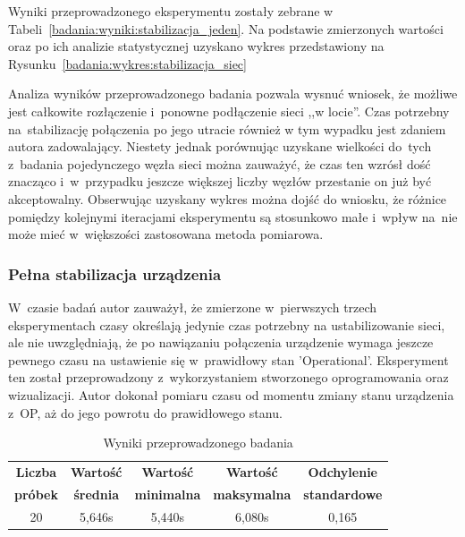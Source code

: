 \noindent Wyniki przeprowadzonego eksperymentu zostały zebrane w Tabeli~\ref{badania:wyniki:stabilizacja_jeden}. Na podstawie zmierzonych wartości oraz po ich analizie statystycznej uzyskano wykres przedstawiony na Rysunku~\ref{badania:wykres:stabilizacja_siec}


Analiza wyników przeprowadzonego badania pozwala wysnuć wniosek, że możliwe jest całkowite rozłączenie i~ponowne podłączenie sieci ,,w locie''. Czas potrzebny na~stabilizację połączenia po jego utracie również w tym wypadku jest zdaniem autora zadowalający. Niestety jednak porównując uzyskane wielkości do~tych z~badania pojedynczego węzła sieci można zauważyć, że czas ten wzrósł dość znacząco i~w~przypadku jeszcze większej liczby węzłów przestanie on już być akceptowalny. Obserwując uzyskany wykres można dojść do wniosku, że różnice pomiędzy kolejnymi iteracjami eksperymentu są stosunkowo małe i~wpływ na~nie może mieć w~większości zastosowana metoda pomiarowa.

\subsubsection{Pełna stabilizacja urządzenia}
W~czasie badań autor zauważył, że zmierzone w~pierwszych trzech eksperymentach czasy określają jedynie czas potrzebny na ustabilizowanie sieci, ale nie uwzględniają, że po nawiązaniu połączenia urządzenie wymaga jeszcze pewnego czasu na ustawienie się w~prawidłowy stan 'Operational'. Eksperyment ten został przeprowadzony z~wykorzystaniem stworzonego oprogramowania oraz wizualizacji. Autor dokonał pomiaru czasu od momentu zmiany stanu urządzenia z~OP, aż do jego powrotu do prawidłowego stanu.

\begin{table}[!htb]
\begin{center}
\begin{tabular}{| c | c | c | c | c |}\hline
\textbf{Liczba} & \textbf{Wartość} & \textbf{Wartość} & \textbf{Wartość} & \textbf{Odchylenie} \\
\textbf{próbek} & \textbf{średnia} & \textbf{minimalna} & \textbf{maksymalna} & \textbf{standardowe} \\\hline\hline
20 & 5,646s & 5,440s & 6,080s & 0,165\\\hline
\end{tabular}
\end{center}
\vspace*{-6mm}
  \caption{Wyniki przeprowadzonego badania}
	\label{badania:wyniki:op_jeden}
\end{table}

